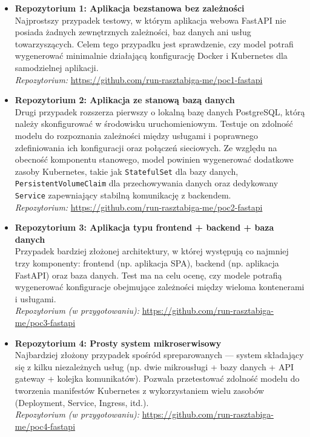\begin{itemize}
    \item \textbf{Repozytorium 1: Aplikacja bezstanowa bez zależności}\\
    Najprostszy przypadek testowy, w którym aplikacja webowa FastAPI nie posiada żadnych zewnętrznych zależności, baz danych ani usług towarzyszących. Celem tego przypadku jest sprawdzenie, czy model potrafi wygenerować minimalnie działającą konfigurację Docker i Kubernetes dla samodzielnej aplikacji.\\
    \textit{Repozytorium:} \url{https://github.com/run-rasztabiga-me/poc1-fastapi}

    \item \textbf{Repozytorium 2: Aplikacja ze stanową bazą danych}\\
    Drugi przypadek rozszerza pierwszy o lokalną bazę danych PostgreSQL, którą należy skonfigurować w środowisku uruchomieniowym. Testuje on zdolność modelu do rozpoznania zależności między usługami i poprawnego zdefiniowania ich konfiguracji oraz połączeń sieciowych. Ze względu na obecność komponentu stanowego, model powinien wygenerować dodatkowe zasoby Kubernetes, takie jak \texttt{StatefulSet} dla bazy danych, \texttt{PersistentVolumeClaim} dla przechowywania danych oraz dedykowany \texttt{Service} zapewniający stabilną komunikację z backendem.\\
    \textit{Repozytorium:} \url{https://github.com/run-rasztabiga-me/poc2-fastapi}

    \item \textbf{Repozytorium 3: Aplikacja typu frontend + backend + baza danych}\\
    Przypadek bardziej złożonej architektury, w której występują co najmniej trzy komponenty: frontend (np. aplikacja SPA), backend (np. aplikacja FastAPI) oraz baza danych. Test ma na celu ocenę, czy modele potrafią wygenerować konfiguracje obejmujące zależności między wieloma kontenerami i usługami.\\
    \textit{Repozytorium (w przygotowaniu):} \url{https://github.com/run-rasztabiga-me/poc3-fastapi}

    \item \textbf{Repozytorium 4: Prosty system mikroserwisowy}\\
    Najbardziej złożony przypadek spośród spreparowanych — system składający się z kilku niezależnych usług (np. dwie mikrousługi + bazy danych + API gateway + kolejka komunikatów). Pozwala przetestować zdolność modelu do tworzenia manifestów Kubernetes z wykorzystaniem wielu zasobów (Deployment, Service, Ingress, itd.).\\
    \textit{Repozytorium (w przygotowaniu):} \url{https://github.com/run-rasztabiga-me/poc4-fastapi}
\end{itemize}

